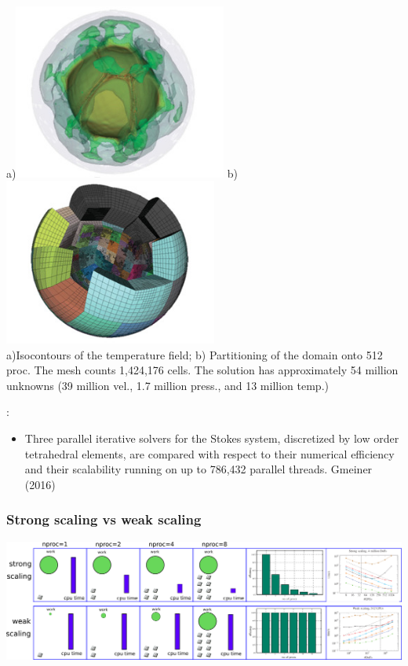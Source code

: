 \begin{center}
a)\includegraphics[width=7cm]{images/parallel/krhb2}
b)\includegraphics[width=7cm]{images/parallel/krhb1} \\
{\captionfont a)Isocontours of the temperature field; b) Partitioning of the domain onto 512 proc. 
The mesh counts 1,424,176 cells. The solution has approximately 54 million unknowns 
(39 million vel., 1.7 million press., and 13 million temp.)
}
\end{center}


\Literature:
\begin{itemize}
\item Three parallel iterative solvers for the Stokes system, discretized by low order 
tetrahedral elements, are compared with respect to their numerical efficiency and their 
scalability running on up to 786,432 parallel threads. Gmeiner \etal (2016) \cite{gmhj16}
\end{itemize}


\subsubsection{Strong scaling vs weak scaling}

\begin{center}
\includegraphics[width=16cm]{images/parallel/fig}
\end{center}


